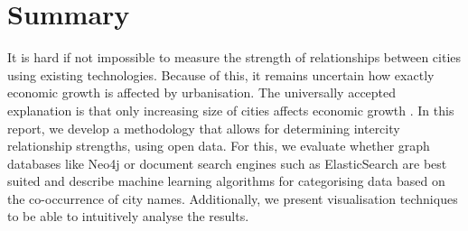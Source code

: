 \newpage

\section*{Summary}




It is hard if not impossible to measure the strength of relationships between cities using existing technologies. Because of this, it remains uncertain how exactly economic growth is affected by urbanisation. The universally accepted explanation is that only increasing size of cities affects economic growth \cite{porter2000location}. In this report, we develop a methodology that allows for determining intercity relationship strengths, using open data. For this, we evaluate whether graph databases like Neo4j \cite{neo4j} or document search engines such as ElasticSearch \cite{elasticsearch} are best suited and describe machine learning algorithms for categorising data based on the co-occurrence of city names. Additionally, we present visualisation techniques to be able to intuitively analyse the results. 


